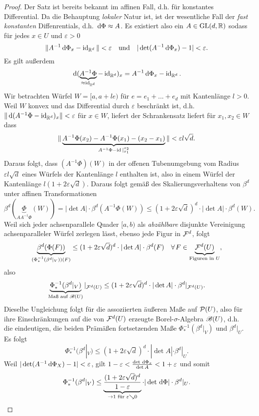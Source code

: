 \begin{satz}
\begin{proof}
Der Satz ist bereits bekannt im affinen Fall, d.h. für konstantes Differential. Da die Behauptung \emph{lokaler} Natur ist, ist der wesentliche Fall der \emph{fast konstanten} Diffenrentials, d.h. $\, \mathrm{d} \Phi \approx A$. Es existiert also ein $A\in \operatorname{GL}(d,\mathbb{R})$ sodass für jedes $x\in U$ und $\varepsilon>0$
$$\|A^{-1}\, \mathrm{d}\Phi_x - \operatorname{id}_{\mathbb{R}^d}\| < \varepsilon	\ \  \text{ und }  \ \ |\det(A^{-1}\, \mathrm{d}\Phi_x)-1| < \varepsilon.$$
Es gilt außerdem
$$\, \mathrm{d} (\underbrace{A^{-1}\Phi}_{\approx \operatorname{id}_{\mathbb{R}^d}} -\operatorname{id}_{\mathbb{R}^d})_x = A^{-1}\, \mathrm{d} \Phi_x-\operatorname{id}_{\mathbb{R}^d}.$$
Wir betrachten Würfel $W=[a,a+le)$ für $e=e_1+...+e_d$ mit Kantenlänge $l>0$. 
Weil $W$ konvex und das Differential durch $\varepsilon$ beschränkt ist, d.h. $\|\, \mathrm{d} (A^{-1}\Phi - \operatorname{id}_{\mathbb{R}^d})_x\|<\varepsilon$ für $x\in W$, liefert der Schrankensatz liefert für $x_1,x_2 \in W$ dass
$$
\|	\underbrace{A^{-1}\Phi(x_2)-A^{-1}\Phi(x_1)-(x_2-x_1)}_{A^{-1}\Phi-\operatorname{id}|_{x_1}^{x_2}}		\| < \varepsilon l \sqrt{d}.
$$
Daraus folgt, dass $(A^{-1}\Phi)(W)$ in der offenen Tubenumgebung vom Radius $\varepsilon l \sqrt{d}$ eines Würfels der Kantenlänge $l$ enthalten ist, also in einem Würfel der Kantenlänge $l(1+2\varepsilon\sqrt{d})$.
Daraus folgt gemäß des Skalierungsverhaltens von $\beta^d$ unter affinen Transformationen
$$\beta^d(\underbrace{\Phi}_{AA^{-1}\Phi}(W))=|\det A| \cdot \beta^d (A^{-1}\Phi(W)) \leq (1+2\varepsilon\sqrt{d})^d\cdot |\det A|\cdot \beta^d(W).$$
Weil sich jeder achsenparallele Quader $[a,b)$ als \emph{abzählbare} disjunkte Vereinigung achsenparalleler Würfel zerlegen lässt, ebenso jede Figur in $\mathcal{F}^d$, folgt
$$
\underbrace{\beta^d(\Phi(F))}_{(\Phi^{-1}_*(\beta^d|_V))(F)} \leq (1+2\varepsilon\sqrt{d})^d \cdot |\det A| \cdot \beta^d(F)\quad \forall F\in \underbrace{\FF^d(U)}_{\te{Figuren in } U},
$$
also
$$
\underbrace{\Phi^{-1}_*(\beta^d|_V)}_{\text{Maß auf }\mathscr{B}(U)}|_{\mathcal{F}^d(U)} \leq (1+2\varepsilon\sqrt{d})^d \cdot |\det A| \cdot \beta^d|_{\mathcal{F}^d(U)}.
$$
Dieselbe Ungleichung folgt für die assoziierten äußeren Maße auf $\mathcal{P}(U)$, also für ihre Einschränkungen auf die von $\mathcal{F}^d(U)$ erzeugte Borel-$\sigma$-Algebra $\mathscr{B}(U)$, d.h. die eindeutigen, die beiden Prämäßen fortsetzenden Maße $\Phi^{-1}_*(\beta^d|_V)$ und $\beta^d|_U$. Es folgt
$$\Phi^{-1}_*(\beta^d|_V)\leq (1+2\varepsilon\sqrt{d})^d\cdot |\det A| \cdot \beta^d|_U.$$
Weil $|\det (A^{-1} \, \mathrm{d} \Phi_X)-1|<\varepsilon$, gilt $1-\varepsilon < \frac{\det \, \mathrm{d}\Phi_x}{\det A}<1+\varepsilon$ und somit
\begin{equation}\label{transf,leq}
\Phi^{-1}_*(\beta^d|_V)\leq \underbrace{\frac{(1+2\varepsilon\sqrt{d})^d}{1-\varepsilon}}_{\to 1 \te{ für }\varepsilon \searrow 0} \cdot |\det \D \Phi| \cdot \beta^d|_U.

\end{equation}
\end{proof}
\end{satz}
